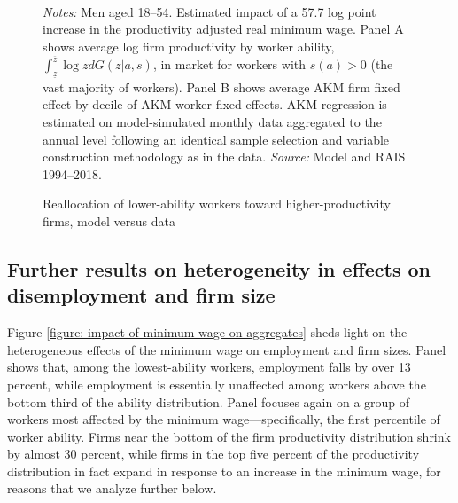 \begin{figure}[!htb]
  \centering
  \caption{Reallocation of lower-ability workers toward higher-productivity firms, model versus data \label{figure: changes in sorting}}
  \prefigvspace
  \\
  \postfigvspace
  \begin{minipage}[t]{1\columnwidth}%
    \begin{spacing}{0.75}
      \emph{\scriptsize{}Notes: }{\scriptsize{}Men aged 18--54. Estimated impact of a 57.7 log point increase in the productivity adjusted real minimum wage. Panel A shows average log firm productivity by worker ability, $\int_{\underline{z}}^{\overline{z}} \log z dG(z|a,s)$, in market for workers with $s(a)>0$ (the vast majority of workers). Panel B shows average AKM firm fixed effect by decile of AKM worker fixed effects. AKM regression is estimated on model-simulated monthly data aggregated to the annual level following an identical sample selection and variable construction methodology as in the data. %
      \emph{\scriptsize{}Source: } Model and RAIS 1994--2018.}
    \end{spacing}
  \end{minipage}
\end{figure}




\clearpage
\subsection{Further results on heterogeneity in effects on disemployment and firm size\label{app_subsec:employment_effects_het_and_fsize}}

Figure \ref{figure: impact of minimum wage on aggregates} sheds light on the heterogeneous effects of the minimum wage on employment and firm sizes. Panel  shows that, among the lowest-ability workers, employment falls by over 13 percent, while employment is essentially unaffected among workers above the bottom third of the ability distribution. Panel  focuses again on a group of workers most affected by the minimum wage---specifically, the first percentile of worker ability. Firms near the bottom of the firm productivity distribution shrink by almost 30 percent, while firms in the top five percent of the productivity distribution in fact expand in response to an increase in the minimum wage, for reasons that we analyze further below.


